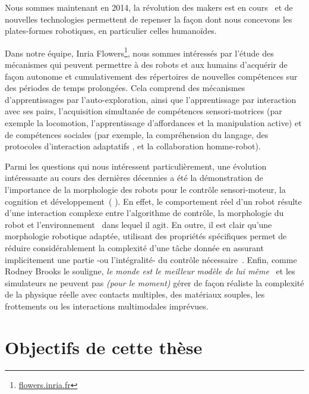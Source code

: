 Nous sommes maintenant en 2014, la révolution des makers est en cours~\parencite{anderson2012makers} et de nouvelles technologies permettent de repenser la façon dont nous concevons les plates-formes robotiques, en particulier celles humanoïdes.


Dans notre équipe, Inria Flowers\footnote{\url{flowers.inria.fr}}, nous sommes intéressés par l'étude des mécanismes qui peuvent permettre à des robots et aux humains d'acquérir de façon autonome et cumulativement des répertoires de nouvelles compétences sur des périodes de temps prolongées. Cela comprend des mécanismes d'apprentissages par l'auto-exploration, ainsi que l'apprentissage par interaction avec ses pairs, l'acquisition simultanée de compétences sensori-motrices (par exemple la locomotion, l'apprentissage d'affordances et la manipulation active) et de compétences sociales (par exemple, la compréhension du langage, des protocoles d'interaction adaptatifs , et la collaboration homme-robot).

Parmi les questions qui nous intéressent particulièrement, une évolution intéressante au cours des dernières décennies a été la démonstration de l'importance de la morphologie des robots pour le contrôle sensori-moteur, la cognition et développement~(\cite{kaplan2008corps} \cite{steels1995artificial} \cite{Pfeifer06}). En effet, le comportement réel d'un robot résulte d'une interaction complexe entre l'algorithme de contrôle, la morphologie du robot et l'environnement~\parencite{Steels1991emergence} dans lequel il agit. En outre, il est clair qu’une morphologie  robotique adaptée, utilisant des propriétés spécifiques permet de réduire considérablement la complexité d'une tâche donnée en assurant implicitement une partie -ou l’intégralité- du contrôle nécessaire~\parencite{pfeifer2005morphological}.
Enfin, comme Rodney Brooks le souligne, \emph{le monde est le meilleur modèle de lui même}~\parencite{brooks1991intelligence} et les simulateurs ne peuvent pas \emph{(pour le moment)} gérer de façon réaliste la complexité de la physique réelle avec contacts multiples, des matériaux souples, les frottements ou les interactions multimodales imprévues.


\section*{Objectifs de cette thèse} %

